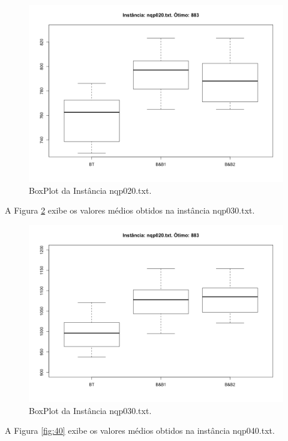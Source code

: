 \documentclass[12pt]{article}
\begin{document}
	\begin{figure}[H]
		\centering
		\includegraphics[width=0.9\linewidth]{img/20}
		\caption{BoxPlot da Instância nqp020.txt.}
		\label{fig:20}
	\end{figure}

	A Figura \ref{fig:30} exibe os valores médios obtidos na instância nqp030.txt.

	\begin{figure}[H]
		\centering
		\includegraphics[width=0.9\linewidth]{img/30}
		\caption{BoxPlot da Instância nqp030.txt.}
		\label{fig:30}
	\end{figure}

	A Figura \ref{fig:40} exibe os valores médios obtidos na instância nqp040.txt.
\end{document}
